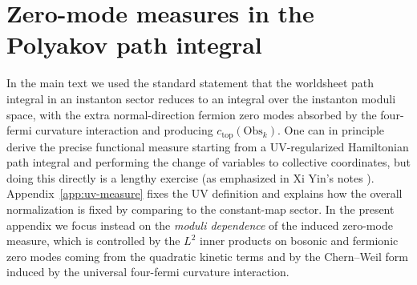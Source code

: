 \documentclass[12pt]{article}
\begin{document}
\section{Zero-mode measures in the Polyakov path integral}
\label{app:zero-mode-measure}

In the main text we used the standard statement that the worldsheet path
integral in an instanton sector reduces to an integral over the instanton
moduli space, with the extra normal-direction fermion zero modes absorbed by
the four-fermi curvature interaction and producing
$c_{\mathrm{top}}(\mathrm{Obs}_k)$. One can in principle derive the precise
functional measure starting from a UV-regularized Hamiltonian path integral and
performing the change of variables to collective coordinates, but doing this
directly is a lengthy exercise (as emphasized in Xi Yin's notes
\cite[Sec.~19.5.4, around Eq.~(19.194)]{Yin:FoundationsStringTheory}).
Appendix~\ref{app:uv-measure} fixes the UV definition and explains how the
overall normalization is fixed by comparing to the constant-map sector. In the
present appendix we focus instead on the
\emph{moduli dependence} of the induced zero-mode measure, which is controlled
by the $L^2$ inner products on bosonic and fermionic zero modes coming from the
quadratic kinetic terms and by the Chern--Weil form induced by the universal
four-fermi curvature interaction.
\end{document}
